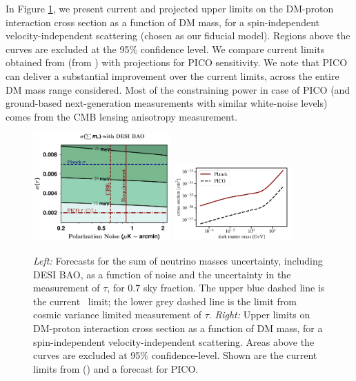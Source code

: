 \documentclass[PICOReport.tex]{subfiles}
\begin{document}
In Figure \ref{fig:DM_baryons}, we present current and projected upper limits on the DM-proton interaction cross section as a function of DM mass, for a spin-independent velocity-independent scattering (chosen as our fiducial model). Regions above the curves are excluded at the 95$\%$ confidence level. We compare current limits obtained from {\planck} (from \cite{2018PhRvL.121h1301G}) with projections for PICO sensitivity.  We note that PICO can deliver a substantial improvement over the current limits, across the entire DM mass range considered.  Most of the constraining power in case of PICO (and ground-based next-generation measurements with similar white-noise levels) comes from the CMB lensing anisotropy measurement.  \\
%
\begin{figure}[t]
\begin{center}
\includegraphics[width=0.47\textwidth]{images/Mnu_tauprior_final.pdf}
\includegraphics[width=0.4\textwidth]{images/pico_dm_baryon.pdf}
\caption{\textit{Left:}  Forecasts for the sum of 
neutrino masses uncertainty, including DESI BAO, as a function of noise and the uncertainty in the measurement of $\tau$, 
for 0.7 sky fraction.  The upper blue dashed line is the current \planck~limit; the lower grey dashed line is the limit from cosmic variance 
limited measurement of $\tau$. \textit{Right:} Upper limits on DM-proton interaction cross section as a function of DM mass, for a spin-independent velocity-independent scattering. Areas above the curves are excluded at 95$\%$ confidence-level.
Shown are the current limits from \planck (\cite{2018PhRvL.121h1301G}) and a forecast for PICO.}\label{fig:DM_baryons}
\end{center}
\end{figure}
\end{document}
